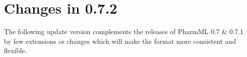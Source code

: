 
\chapter{Changes in 0.7.2}
\label{ch:072changes}
The following update version complements the releases of PharmML 0.7 \& 0.7.1 
by few extensions or changes which will make the format more consistent 
and flexible. 

\section{}












